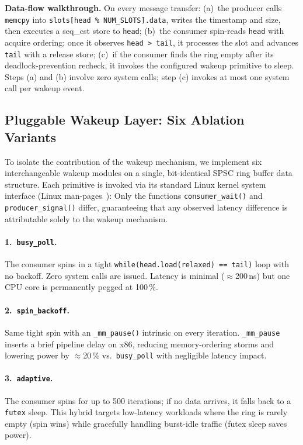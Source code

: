 \documentclass[10pt,conference]{IEEEtran}
\begin{document}
\textbf{Data-flow walkthrough.}  On every message transfer: (a)~the producer
calls \texttt{memcpy} into \texttt{slots[head \% NUM\_SLOTS].data}, writes the
timestamp and size, then executes a seq\_cst store to \texttt{head};
(b)~the consumer spin-reads \texttt{head} with acquire ordering; once it
observes \texttt{head > tail}, it processes the slot and advances \texttt{tail}
with a release store; (c)~if the consumer finds the ring empty after its
deadlock-prevention recheck, it invokes the configured wakeup primitive to
sleep.  Steps (a) and (b) involve zero system calls; step (c) invokes at most
one system call per wakeup event.

\subsection{Pluggable Wakeup Layer: Six Ablation Variants}

To isolate the contribution of the wakeup mechanism, we implement six
interchangeable wakeup modules on a single, bit-identical SPSC ring buffer data
structure.  Each primitive is invoked via its standard Linux kernel system
interface (Linux man-pages~\cite{linux-man}): Only the
functions \texttt{consumer\_wait()} and \texttt{producer\_signal()} differ,
guaranteeing that any observed latency difference is attributable solely to
the wakeup mechanism.

\paragraph{1.~\texttt{busy\_poll}.}
The consumer spins in a tight \texttt{while(head.load(relaxed) == tail)} loop
with no backoff.  Zero system calls are issued.  Latency is minimal
($\approx$200\,ns) but one CPU core is permanently pegged at 100\,\%.

\paragraph{2.~\texttt{spin\_backoff}.}
Same tight spin with an \texttt{\_mm\_pause()} intrinsic on every iteration.
\texttt{\_mm\_pause} inserts a brief pipeline delay on x86, reducing
memory-ordering storms and lowering power by $\approx$20\,\% vs.\
\texttt{busy\_poll} with negligible latency impact.

\paragraph{3.~\texttt{adaptive}.}
The consumer spins for up to 500 iterations; if no data arrives, it falls back
to a \texttt{futex} sleep.  This hybrid targets low-latency workloads where the
ring is rarely empty (spin wins) while gracefully handling burst-idle traffic
(futex sleep saves power).
\end{document}
